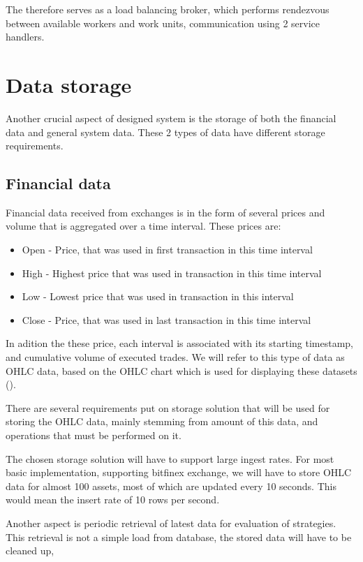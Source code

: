 The  therefore serves as a load balancing broker, which performs rendezvous between available workers
and work units, communication using 2 service handlers.

\section{Data storage}
Another crucial aspect of designed system is the storage of both the financial data and general system data.
These 2 types of data have different storage requirements.

\subsection{Financial data}
Financial data received from exchanges is in the form of several prices and volume that is aggregated over a time interval.
These prices are:
\begin{itemize}
\item{Open - } Price, that was used in first transaction in this time interval
\item{High - } Highest price that was used in transaction in this time interval
\item{Low - }  Lowest price that was used in transaction in this interval
\item{Close -} Price, that was used in last transaction in this time interval
\end{itemize}
In adition the these price, each interval is associated with its starting timestamp, and cumulative volume
of executed trades. We will refer to this type of data as OHLC data, based on the OHLC chart which is used for displaying
these datasets ().

There are several requirements put on storage solution that will be used for storing the OHLC data, mainly stemming from
amount of this data, and operations that must be performed on it.

The chosen storage solution will have to support large ingest rates. For most basic implementation, supporting bitfinex exchange,
we will have to store OHLC data for almost 100 assets, most of which are updated every 10 seconds. This would mean
the insert rate of 10 rows per second.

Another aspect is periodic retrieval of latest data for evaluation of strategies. This retrieval is not a simple load from database,
the stored data will have to be cleaned up,

